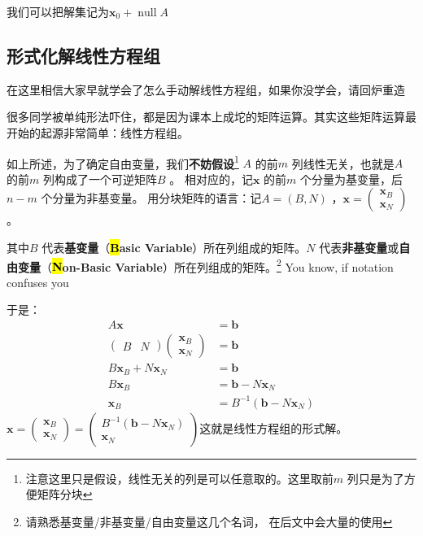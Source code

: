 \documentclass{../mathnotes-art}
\renewcommand{\b}{\mathbf{b}}
\newcommand{\x}{\mathbf{x}}
\DeclareMathOperator{\nullspace}{null}
\begin{document}
我们可以把解集记为\(\x_{0} + \nullspace{A}\)

\subsection{形式化解线性方程组}

在这里相信大家早就学会了怎么手动解线性方程组，如果你没学会，请回炉重造

很多同学被单纯形法吓住，都是因为课本上成坨的矩阵运算。其实这些矩阵运算最开始的起源非常简单：线性方程组。

如上所述，为了确定自由变量，我们\textbf{不妨假设}\footnote{注意这里只是假设，线性无关的列是可以任意取的。这里取前\(m\)
列只是为了方便矩阵分块} \(A\) 的前\(m\) 列线性无关，也就是\(A\) 的前\(m\) 列构成了一个可逆矩阵\(B\) 。
相对应的，记\(\x\) 的前\(m\) 个分量为基变量，后\(n-m\) 个分量为非基变量。
用分块矩阵的语言：记\(A = (B, N)\) ，\(\x =
    \begin{pmatrix}
        \x_{B} \\
        \x_{N}
\end{pmatrix}\)。

其中\(B\) 代表\textbf{基变量}（\textbf{\hl{B}asic Variable}）所在列组成的矩阵。\(N\)
代表\textbf{非基变量}或\textbf{自由变量}（\textbf{\hl{N}on-Basic
Variable}）所在列组成的矩阵。\footnote{请熟悉基变量/非基变量/自由变量这几个名词，
在后文中会大量的使用}
You know, if notation confuses you 

于是：
\begin{align*}
    A\x &= \b \\
    \begin{pmatrix}
        B & N
    \end{pmatrix}
    \begin{pmatrix}
        \x_{B} \\
        \x_{N}
    \end{pmatrix} &= \b \\
    B\x_{B} + N\x_{N} &= \b \\
    B\x_{B} &= \b - N\x_{N} \\
    \x_{B} &= B^{-1}(\b - N\x_{N})
\end{align*}
\(\x =
    \begin{pmatrix}
        \x_{B} \\
        \x_{N}
    \end{pmatrix} =
    \begin{pmatrix}
        B^{-1}(\b - N\x_{N}) \\
        \x_{N}
\end{pmatrix}\)这就是线性方程组的形式解。
\end{document}
